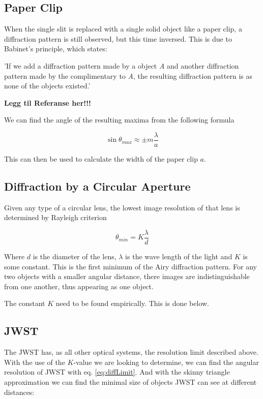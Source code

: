 \documentclass{emulateapj}
\begin{document}
\subsection{Paper Clip}\label{sec:theoryPaperClip}
When the single slit is replaced with a single solid object like a paper clip, a diffraction pattern is still observed, but this time inversed. This is due to Babinet's principle, which states: 

'If we add a diffraction pattern made by a object \textit{A} and another diffraction pattern made by the complimentary to \textit{A}, the resulting diffraction pattern is as none of the objects existed.'

\textbf{Legg til Referanse her!!!}

We can find the angle of the resulting maxima from the following formula

\begin{equation}
\sin \theta_{max} \approx \pm m\frac{\lambda}{a}
\end{equation}\label{eq:paperClipMax}

This can then be used to calculate the width of the paper clip $a$.

\subsection{Diffraction by a Circular Aperture}\label{sec:theoryAiry}
Given any type of a circular lens, the lowest image resolution of that lens is determined by Rayleigh criterion

\begin{equation}
\theta_{min} = K\frac{\lambda}{d}
\end{equation}\label{eq:diffLimit}

Where $d$ is the diameter of the lens, $\lambda$ is the wave length of the light and $K$ is some constant. This is the first minimum of the Airy diffraction pattern. For any two objects with a smaller angular distance, there images are indistinguishable from one another, thus appearing as one object.

The constant $K$ need to be found empirically. This is done below.


\subsection{JWST}
The JWST has, as all other optical systems, the resolution limit described above. With the use of the $K$-value we are looking to determine, we can find the angular resolution of JWST with eq. \eqref{eq:diffLimit}. And with the skinny triangle approximation we can find the minimal size of objects JWST can see at different distances:
\end{document}
